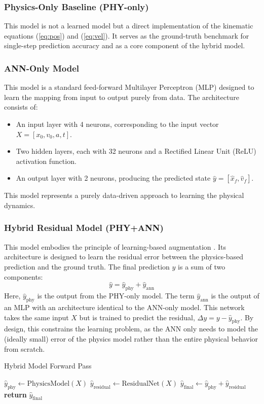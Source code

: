 \documentclass[conference]{IEEEtran}
\begin{document}
\subsubsection{Physics-Only Baseline (PHY-only)}
This model is not a learned model but a direct implementation of the kinematic equations (\ref{eq:pos}) and (\ref{eq:vel}). It serves as the ground-truth benchmark for single-step prediction accuracy and as a core component of the hybrid model.

\subsubsection{ANN-Only Model}
This model is a standard feed-forward Multilayer Perceptron (MLP) designed to learn the mapping from input to output purely from data. The architecture consists of:
\begin{itemize}
    \item An input layer with 4 neurons, corresponding to the input vector $X = [x_0, v_0, a, t]$.
    \item Two hidden layers, each with 32 neurons and a Rectified Linear Unit (ReLU) activation function.
    \item An output layer with 2 neurons, producing the predicted state $\hat{y} = [\hat{x}_f, \hat{v}_f]$.
\end{itemize}
This model represents a purely data-driven approach to learning the physical dynamics.

\subsubsection{Hybrid Residual Model (PHY+ANN)}
This model embodies the principle of learning-based augmentation \cite{b8}. Its architecture is designed to learn the residual error between the physics-based prediction and the ground truth. The final prediction $\hat{y}$ is a sum of two components:
$$\hat{y} = \hat{y}_{\text{phy}} + \hat{y}_{\text{ann}}$$
Here, $\hat{y}_{\text{phy}}$ is the output from the PHY-only model. The term $\hat{y}_{\text{ann}}$ is the output of an MLP with an architecture identical to the ANN-only model. This network takes the same input $X$ but is trained to predict the residual, $\Delta y = y - \hat{y}_{\text{phy}}$. By design, this constrains the learning problem, as the ANN only needs to model the (ideally small) error of the physics model rather than the entire physical behavior from scratch.

\begin{algorithm}
\caption{Hybrid Model Forward Pass}\label{alg:hybrid}
\begin{algorithmic}[1]
    \State $\hat{y}_{\text{phy}} \gets \text{PhysicsModel}(X)$
    \State $\hat{y}_{\text{residual}} \gets \text{ResidualNet}(X)$
    \State $\hat{y}_{\text{final}} \gets \hat{y}_{\text{phy}} + \hat{y}_{\text{residual}}$
    \State \textbf{return} $\hat{y}_{\text{final}}$
\EndFunction
\end{algorithmic}
\end{algorithm}
\end{document}

